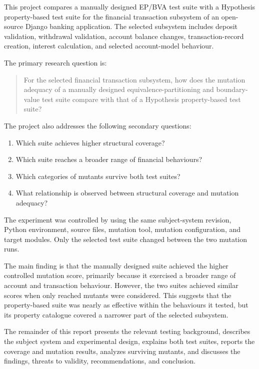 \documentclass[12pt]{article}
\begin{document}
This project compares a manually designed EP/BVA test suite with a Hypothesis
property-based test suite for the financial transaction subsystem of an
open-source Django banking application. The selected subsystem includes
deposit validation, withdrawal validation, account balance changes,
transaction-record creation, interest calculation, and selected account-model
behaviour.

The primary research question is:

\begin{quote}
For the selected financial transaction subsystem, how does the mutation
adequacy of a manually designed equivalence-partitioning and boundary-value
test suite compare with that of a Hypothesis property-based test suite?
\end{quote}

The project also addresses the following secondary questions:

\begin{enumerate}
    \item Which suite achieves higher structural coverage?
    \item Which suite reaches a broader range of financial behaviours?
    \item Which categories of mutants survive both test suites?
    \item What relationship is observed between structural coverage and
          mutation adequacy?
\end{enumerate}

The experiment was controlled by using the same subject-system revision,
Python environment, source files, mutation tool, mutation configuration, and
target modules. Only the selected test suite changed between the two mutation
runs.

The main finding is that the manually designed suite achieved the higher
controlled mutation score, primarily because it exercised a broader range of
account and transaction behaviour. However, the two suites achieved similar
scores when only reached mutants were considered. This suggests that the
property-based suite was nearly as effective within the behaviours it tested,
but its property catalogue covered a narrower part of the selected subsystem.

The remainder of this report presents the relevant testing background,
describes the subject system and experimental design, explains both test
suites, reports the coverage and mutation results, analyzes surviving mutants,
and discusses the findings, threats to validity, recommendations, and
conclusion.
\end{document}
